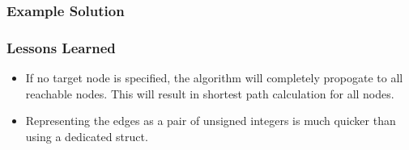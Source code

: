 \subsubsection{Example Solution}

\subsubsection{Lessons Learned}
\begin{itemize}
	\item If no target node is specified, the algorithm will completely propogate to all reachable nodes.
		This will result in shortest path calculation for all nodes.
	\item Representing the edges as a pair of unsigned integers is much quicker than using a dedicated struct.
\end{itemize}
